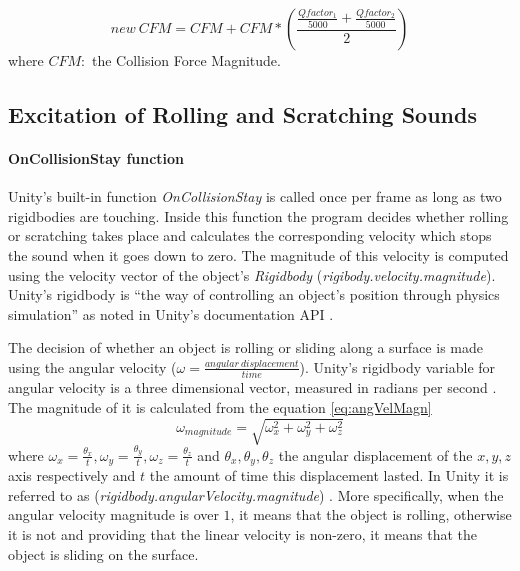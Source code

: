 \begin{equation}
new\ CFM = CFM + CFM*\left( \frac{\frac{Qfactor_1}{5000} + \frac{Qfactor_2}{5000}}{2} \right)
\end{equation} 
\noindent where $CFM:$ the Collision Force Magnitude.


\subsection{Excitation of Rolling and Scratching Sounds}
\paragraph{OnCollisionStay function\\}

Unity\textsuperscript{\textregistered}'s built-in function \textit{OnCollisionStay} \cite{bib:unity_doc} is called once per frame as long as two rigidbodies are touching. Inside this function the program decides whether rolling or scratching takes place and calculates the corresponding velocity which stops the sound when it goes down to zero. The magnitude of this velocity is computed using the velocity vector of the object's \textit{Rigidbody} (\textit{rigibody.velocity.magnitude}). Unity\textsuperscript{\textregistered}'s rigidbody is ``the way of controlling an object's position through physics simulation'' as noted in Unity\textsuperscript{\textregistered}'s documentation API \cite{bib:unity_doc}.

The decision of whether an object is rolling or sliding along a surface is made using the angular velocity ($\omega = \frac{angular\ displacement}{time}$). Unity\textsuperscript{\textregistered}'s rigidbody variable for angular velocity is a three dimensional vector, measured in radians per second \cite{bib:unity_doc}. The magnitude of it is calculated from the equation \ref{eq:angVelMagn}
\begin{equation}\label{eq:angVelMagn}
\omega_{magnitude} = \sqrt{\omega_x^2+\omega_y^2+\omega_z^2}
\end{equation}
where $\omega_x = \frac{\theta_x}{t}, \omega_y = \frac{\theta_y}{t}, \omega_z = \frac{\theta_z}{t}$ and $\theta_x, \theta_y, \theta_z$ the angular displacement of the $x, y, z$ axis respectively and $t$ the amount of time this displacement lasted. In Unity\textsuperscript{\textregistered} it is referred to as (\textit{rigidbody.angularVelocity.magnitude}) \cite{bib:unity_doc}. More specifically, when the angular velocity magnitude is over $1$, it means that the object is rolling, otherwise it is not and providing that the linear velocity is non-zero, it means that the object is sliding on the surface. 








